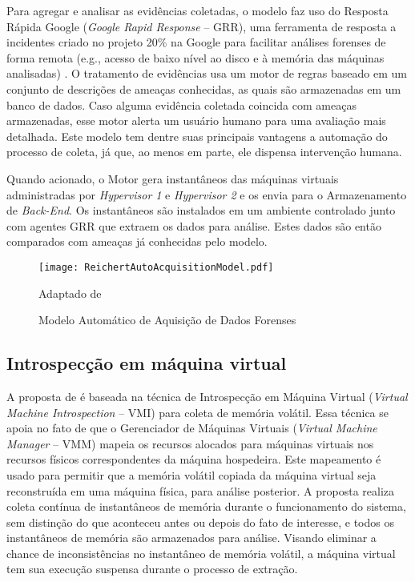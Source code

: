 Para agregar e analisar as evidências coletadas, o modelo faz uso do Resposta Rápida Google (\textit{Google Rapid Response} -- GRR), uma ferramenta de resposta a incidentes criado no projeto 20\% na Google para facilitar análises forenses de forma remota (e.g., acesso de baixo nível ao disco e à memória das máquinas analisadas) \cite{GRRRapidResponse:2013}.
%
O tratamento de evidências usa um motor de regras baseado em um conjunto de descrições de ameaças conhecidas, as quais são armazenadas em um banco de dados.
%
Caso alguma evidência coletada coincida com ameaças armazenadas, esse motor alerta um usuário humano para uma avaliação mais detalhada.
%
Este modelo tem dentre suas principais vantagens a automação do processo de coleta, já que, ao menos em parte, ele dispensa intervenção humana. 


Quando acionado, o Motor gera instantâneos das máquinas virtuais administradas por \textit{Hypervisor 1} e \textit{Hypervisor 2} e os envia para o Armazenamento de \textit{Back-End}.
%
Os instantâneos são instalados em um ambiente controlado junto com agentes GRR que extraem os dados para análise. 
%
Estes dados são então comparados com ameaças já conhecidas pelo modelo.

\begin{figure}[htb!]
\footnotesize
\caption{Modelo Automático de Aquisição de Dados Forenses} %
\texttt{[image: ReichertAutoAcquisitionModel.pdf]}
\centering
\label{fig:ReichertAutoAcquisitionModel}
\begin{center}
Adaptado de \cite{ReichertAutoAcquisition:2015} 
\end{center}
\end{figure}


\subsection{Introspecção em máquina virtual}
\label{sec:VMI}

A proposta de \cite{PoiselVMI:2013} é baseada na técnica de Introspecção em Máquina Virtual (\textit{Virtual Machine Introspection} -- VMI) para coleta de memória volátil. 
%
Essa técnica se apoia no fato de que o Gerenciador de Máquinas Virtuais (\textit{Virtual Machine Manager} -- VMM) mapeia os recursos alocados para máquinas virtuais nos recursos físicos correspondentes da máquina hospedeira.
%
Este mapeamento é usado para permitir que a memória volátil copiada da máquina virtual seja reconstruída em uma máquina física, para análise posterior.
%
A proposta realiza coleta contínua de instantâneos de memória durante o funcionamento do sistema, sem distinção do que aconteceu antes ou depois do fato de interesse, e todos os instantâneos de memória são armazenados para análise.
%
Visando eliminar a chance de inconsistências no instantâneo de memória volátil, a máquina virtual tem sua execução suspensa durante o processo de extração.


